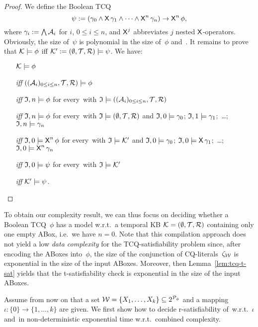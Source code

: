 \begin{proof}
    We define the Boolean TCQ
    \[\psi:=(\gamma_0\land\operatorname{\mathsf{X}}\gamma_1\land\dots\land\operatorname{\mathsf{X}}^n\gamma_n)\to\operatorname{\mathsf{X}}^n\phi,\]
    where $\gamma_i:=\bigwedge\mathcal{A}_i$ for $i$, $0\le i\le n$, and $\operatorname{\mathsf{X}}^j$
    abbreviates $j$ nested $\operatorname{\mathsf{X}}$-operators.  Obviously, the size of~$\psi$ is
    polynomial in the size of~$\phi$ and~\Kmc.
    It remains to prove that $\mathcal{K}\models\phi$ iff
    $\mathcal{K}':=(\emptyset,\mathcal{T},\mathcal{R})\models\psi$.  We have:
    \begin{itemize}
        \item[]
            $\mathcal{K}\models\phi$
        \item[\emph{iff}]
            $((\mathcal{A}_i)_{0\le i\le n},\mathcal{T},\mathcal{R})\models\phi$
        \item[\emph{iff}]
            $\mathfrak{I},n\models\phi$ for every~\Imf with
            $\mathfrak{I}\models((\mathcal{A}_i)_{0\le i\le n},\mathcal{T},\mathcal{R})$
        \item[\emph{iff}]
            $\mathfrak{I},n\models\phi$ for every~\Imf with
            $\mathfrak{I}\models(\emptyset,\mathcal{T},\mathcal{R})$ and
            $\mathfrak{I},0\models\gamma_0$;
            $\mathfrak{I},1\models\gamma_1$;~\dots;
            $\mathfrak{I},n\models\gamma_n$
        \item[\emph{iff}]
            $\mathfrak{I},0\models\operatorname{\mathsf{X}}^n\phi$ for every~\Imf with
            $\mathfrak{I}\models\mathcal{K}'$ and
            $\mathfrak{I},0\models\gamma_0$;
            $\mathfrak{I},0\models\operatorname{\mathsf{X}}\gamma_1$;~\dots;
            $\mathfrak{I},0\models\operatorname{\mathsf{X}}^n\gamma_n$
        \item[\emph{iff}]
            $\mathfrak{I},0\models\psi$ for every~\Imf with $\mathfrak{I}\models\mathcal{K}'$
        \item[\emph{iff}]
            $\mathcal{K}'\models\psi$.
    \end{itemize}
\end{proof}

\noindent
To obtain our complexity result, we can thus focus on deciding whether a Boolean
TCQ~$\phi$ has a model w.r.t.\ a temporal KB $\mathcal{K}=(\emptyset,\mathcal{T},\mathcal{R})$
containing only one empty ABox, i.e.~we have $n=0$.
%
Note that this compilation approach does not yield a low \emph{data
complexity} for the TCQ-satisfiability problem since, after encoding the ABoxes
into~$\phi$, the size of the conjunction of CQ-literals~$\zeta_\mathcal{W}$ is
exponential in the size of the input ABoxes.  Moreover, then
Lemma~\ref{lem:tcq-t-sat} yields that the t-satisfiability check is exponential
in the size of the input ABoxes.

Assume from now on that a set
$\mathcal{W}=\{X_1,\dots,X_k\}\subseteq 2^{\mathcal{P}_\phi}$ and a mapping
$\iota\colon\{0\}\to\{1,\dots,k\}$ are given.
%
We first show how to decide r-satisfiability of~\Wmc w.r.t.~$\iota$ and~\Kmc in
non-deterministic exponential time w.r.t.\ combined complexity.

